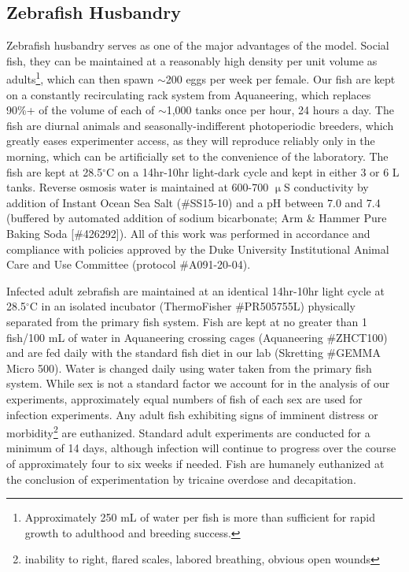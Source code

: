 \subsection{Zebrafish Husbandry}\label{husbandry}

Zebrafish husbandry serves as one of the major advantages of the model. Social fish, they can be maintained at a reasonably high density per unit volume as adults\footnote{Approximately 250 mL of water per fish is more than sufficient for rapid growth to adulthood and breeding success.}, which can then spawn ${\sim}$200 eggs per week per female. Our fish are kept on a constantly recirculating rack system from Aquaneering, which replaces 90\%+ of the volume of each of ${\sim}$1,000 tanks once per hour, 24 hours a day. The fish are diurnal animals and seasonally\hyp{}indifferent photoperiodic breeders, which greatly eases experimenter access, as they will reproduce reliably only in the morning, which can be artificially set to the convenience of the laboratory. The fish are kept at 28.5$^{\circ}$C on a 14hr\hyp{}10hr light\hyp{}dark cycle and kept in either 3 or 6 L tanks. Reverse osmosis water is maintained at 600\hyp{}700 $\upmu$S conductivity by addition of Instant Ocean Sea Salt (\#SS15\hyp{}10) and a pH between 7.0 and 7.4 (buffered by automated addition of sodium bicarbonate; Arm \& Hammer Pure Baking Soda [\#426292]). All of this work was performed in accordance and compliance with policies approved by the Duke University Institutional Animal Care and Use Committee (protocol \#A091\hyp{}20\hyp{}04).

Infected adult zebrafish are maintained at an identical 14hr\hyp{}10hr light cycle at 28.5$^{\circ}$C in an isolated incubator (ThermoFisher \#PR505755L) physically separated from the primary fish system. Fish are kept at no greater than 1 fish/100 mL of water in Aquaneering crossing cages (Aquaneering \#ZHCT100) and are fed daily with the standard fish diet in our lab (Skretting \#GEMMA Micro 500). Water is changed daily using water taken from the primary fish system. While sex is not a standard factor we account for in the analysis of our experiments, approximately equal numbers of fish of each sex are used for infection experiments. Any adult fish exhibiting signs of imminent distress or morbidity\footnote{inability to right, flared scales, labored breathing, obvious open wounds} are euthanized. Standard adult experiments are conducted for a minimum of 14 days, although infection will continue to progress over the course of approximately four to six weeks if needed. Fish are humanely euthanized at the conclusion of experimentation by tricaine overdose and decapitation.

